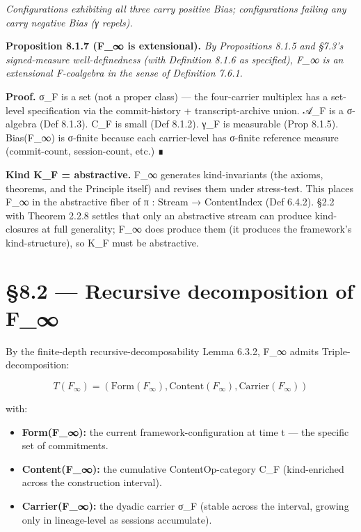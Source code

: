\documentclass[11pt, openany]{book}
\newcommand{\sectionbreak}{\clearpage}
\begin{document}
\textit{Configurations exhibiting all three carry positive Bias; configurations failing any carry negative Bias (γ repels).}

\textbf{Proposition 8.1.7 (F\_\allowbreak{}∞ is extensional).} \textit{By Propositions 8.1.5 and §7.3's signed-measure well-definedness (with Definition 8.1.6 as specified), F\_\allowbreak{}∞ is an extensional F-coalgebra in the sense of Definition 7.6.1.}

\textbf{Proof.} σ\_\allowbreak{}F is a set (not a proper class) --- the four-carrier multiplex has a set-level specification via the commit-history + transcript-archive union. 𝒜\_\allowbreak{}F is a σ-algebra (Def 8.1.3). C\_\allowbreak{}F is small (Def 8.1.2). γ\_\allowbreak{}F is measurable (Prop 8.1.5). Bias(F\_\allowbreak{}∞) is σ-finite because each carrier-level has σ-finite reference measure (commit-count, session-count, etc.) ∎

\textbf{Kind K\_\allowbreak{}F = abstractive.} F\_\allowbreak{}∞ generates kind-invariants (the axioms, theorems, and the Principle itself) and revises them under stress-test. This places F\_\allowbreak{}∞ in the abstractive fiber of π : Stream → ContentIndex (Def 6.4.2). §2.2 with Theorem 2.2.8 settles that only an abstractive stream can produce kind-closures at full generality; F\_\allowbreak{}∞ does produce them (it produces the framework's kind-structure), so K\_\allowbreak{}F must be abstractive.

\sectionbreak

\section{§8.2 --- Recursive decomposition of F\_\allowbreak{}∞}

By the finite-depth recursive-decomposability Lemma 6.3.2, F\_\allowbreak{}∞ admits Triple-decomposition:

\[
T(F_\infty) = (\mathrm{Form}(F_\infty), \mathrm{Content}(F_\infty), \mathrm{Carrier}(F_\infty))
\]

with:

\begin{itemize}
\item \textbf{Form(F\_\allowbreak{}∞):} the current framework-configuration at time t --- the specific set of commitments.
\item \textbf{Content(F\_\allowbreak{}∞):} the cumulative ContentOp-category C\_\allowbreak{}F (kind-enriched across the construction interval).
\item \textbf{Carrier(F\_\allowbreak{}∞):} the dyadic carrier σ\_\allowbreak{}F (stable across the interval, growing only in lineage-level as sessions accumulate).
\end{itemize}
\end{document}
